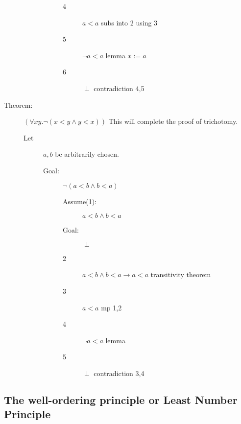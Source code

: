 \documentclass[12pt]{article}
\begin{document}
\begin{description}
\begin{description}
\begin{description}
\begin{description}
\item[4]  $a<a$  subs into 2 using 3

\item[5]  $\neg a<a$  lemma $x:=a$

\item[6] $\perp$  contradiction 4,5




\end{description}

\end{description}

\end{description}

\item[Theorem:]  $(\forall xy.\neg(x<y \wedge y<x))$  This will complete the proof of trichotomy.

\begin{description}

\item[Let] $a,b$ be arbitrarily chosen.

\begin{description}

\item[Goal:]  $\neg(a<b \wedge b<a)$

\begin{description}

\item[Assume(1):]  $a<b \wedge b<a$

\item[Goal:]  $\perp$

\item[2] $a<b \wedge b<a \rightarrow a<a$  transitivity theorem

\item[3]  $a<a$  mp 1,2

\item[4]  $\neg a<a$  lemma

\item[5]  $\perp$ contradiction 3,4

\end{description}


\end{description}


\end{description}

\end{description}




\subsection{The well-ordering principle or Least Number Principle}
\end{document}
